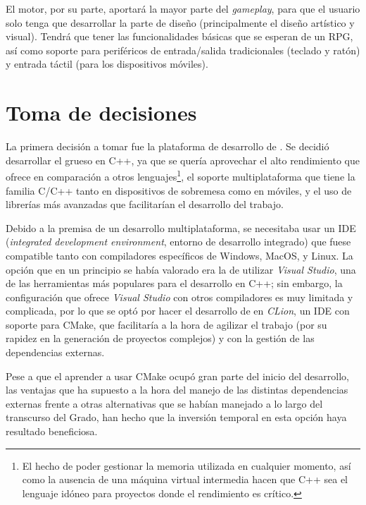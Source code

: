 \medskip

El motor, por su parte, aportará la mayor parte del \textit{gameplay}, para que el usuario solo tenga que desarrollar la parte de diseño (principalmente el diseño artístico y visual). Tendrá que tener las funcionalidades básicas que se esperan de un RPG, así como soporte para periféricos de entrada/salida tradicionales (teclado y ratón) y entrada táctil (para los dispositivos móviles). 

\section{Toma de decisiones}
\label{sec:decisiones}
La primera decisión a tomar fue la plataforma de desarrollo de \baker. Se decidió desarrollar el grueso en C++, ya que se quería aprovechar el alto rendimiento que ofrece en comparación a otros lenguajes\footnote{El hecho de poder gestionar la memoria utilizada en cualquier momento, así como la ausencia de una máquina virtual intermedia hacen que C++ sea el lenguaje idóneo para proyectos donde el rendimiento es crítico.}, el soporte multiplataforma que tiene la familia C/C++ tanto en dispositivos de sobremesa como en móviles, y el uso de librerías más avanzadas que facilitarían el desarrollo del trabajo.

\medskip

Debido a la premisa de un desarrollo multiplataforma, se necesitaba usar un IDE (\textit{integrated development environment}, entorno de desarrollo integrado) que fuese compatible tanto con compiladores específicos de Windows, MacOS, y Linux. La opción que en un principio se había valorado era la de utilizar \textit{Visual Studio}, una de las herramientas más populares para el desarrollo en C++; sin embargo, la configuración que ofrece \textit{Visual Studio} con otros compiladores es muy limitada y complicada, por lo que se optó por hacer el desarrollo de \baker{} en \textit{CLion}, un IDE con soporte para CMake, que facilitaría a la hora de agilizar el trabajo (por su rapidez en la generación de proyectos complejos) y con la gestión de las dependencias externas.

\smallskip

Pese a que el aprender a usar CMake ocupó gran parte del inicio del desarrollo, las ventajas que ha supuesto a la hora del manejo de las distintas dependencias externas frente a otras alternativas que se habían manejado a lo largo del transcurso del Grado, han hecho que la inversión temporal en esta opción haya resultado beneficiosa.

